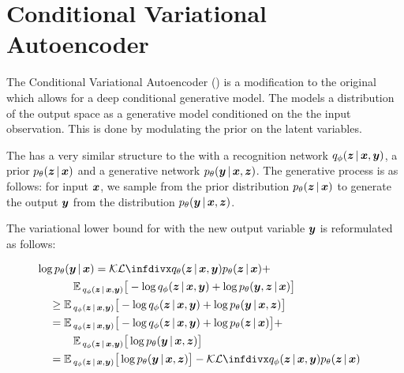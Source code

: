 \section{Conditional Variational Autoencoder}

The Conditional Variational Autoencoder (\cvae{}) is a modification to the original \vae{} which allows for a deep conditional generative model. The \cvae{} models a distribution of the output space as a generative model conditioned on the the input observation. This is done by modulating the prior on the latent variables.

The \cvae{} has a very similar structure to the \vae{} with a recognition network $\qphi \given{\vz}{\vx, \vy}$, a prior $\ptheta \given{\vz}{\vx}$ and a generative network $p_{\theta}\given{\vy}{\vx, \vz}$. The generative process is as follows: for input $\boldsymbol{x}$, we sample from the prior distribution $\ptheta \given{\vz}{\vx}$ to generate the output $\boldsymbol{y}$ from the distribution $\ptheta \given{\vy}{\vx, \vz}$.


The variational lower bound for \cvae{} with the new output variable $\boldsymbol{y}$ is reformulated as follows:

\begin{align}
\nonumber \lefteqn{\log p_{\theta}\given{\vy}{\vx} = \KL{q_{\theta}\given{\vz}{\vx, \vy}}{p_{\theta}\given{\vz}{\vx}} +} \\
& & & \qquad \E{}_{q_{\phi}\given{\vz}{\vx, \vy}} \big [ - \log q_{\phi}\given{\vz}{\vx, \vy} + \log p_{\theta}\given{\vy, \vz}{\vx} \big] \nonumber \\
& & & \geq \E{}_{q_{\phi}\given{\vz}{\vx, \vy}} \big [ - \log q_{\phi}\given{\vz}{\vx, \vy} + \log p_{\theta}\given{\vy}{\vx, \vz} \big ]
\nonumber \\
& & & = \E{}_{q_{\phi}\given{\vz}{\vx, \vy}} \big [ - \log q_{\phi}\given{\vz}{\vx, \vy} + \log p_{\theta}\given{\vz}{\vx} \big ] + \nonumber \\
& & & \qquad \E{}_{q_{\phi}\given{\vz}{\vx, \vy}} \big [ \log p_{\theta} \given{\vy}{\vx, \vz} \big ] \nonumber \\
& & & = \E{}_{q_{\phi}\given{\vz}{\vx, \vy}} \big [ \log p_{\theta} \given{\vy}{\vx, \vz} \big ] - \KL{q_{\phi}\given{\vz}{\vx, \vy}}{p_{\theta}\given{\vz}{\vx}}
\label{eq:cvae}
\end{align}


